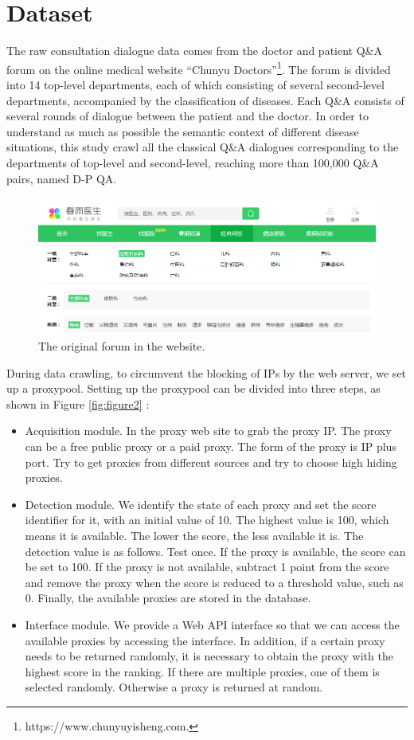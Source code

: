 \section{Dataset}
\label{dataset}

The raw consultation dialogue data comes from the doctor and patient Q\&A 
forum on the online medical website ``Chunyu Doctors''\footnote{https://www.chunyuyisheng.com.}. 
The forum is divided into 14 top-level departments, 
each of which consisting of several second-level departments, 
accompanied by the classification of diseases. 
Each Q\&A consists of several rounds of dialogue between the patient and the doctor. In order to understand as much as possible the semantic context of different disease situations, this study crawl all the classical Q\&A dialogues corresponding to the departments of top-level and second-level, reaching more than 100,000 Q\&A pairs, named D-P QA.

\begin{figure}[h]
\centering
\includegraphics[scale=0.22]{2.png}
\caption{The original forum in the website.}
\label{fig:figure1}
\end{figure}

During data crawling, to circumvent the blocking of IPs by the web server, 
we set up a proxypool. 
Setting up the proxypool can be divided into three steps, as shown in Figure \ref{fig:figure2} : 
\begin{itemize}
\item[(1)]Acquisition module. In the proxy web site to grab the proxy IP. The proxy can be a free public proxy or a paid proxy. The form of the proxy is IP plus port. Try to get proxies from different sources and try to choose high hiding proxies. 
\item[(2)]Detection module. We identify the state of each proxy and set the score identifier for it, with an initial value of 10. The highest value is 100, which means it is available. The lower the score, the less available it is. The detection value is as follows. Test once. If the proxy is available, the score can be set to 100. If the proxy is not available, subtract 1 point from the score and remove the proxy when the score is reduced to a threshold value, such as 0. Finally, the available proxies are stored in the database.
\item[(3)]Interface module. We provide a Web API interface so that we can access the available proxies by accessing the interface. In addition, if a certain proxy needs to be returned randomly, it is necessary to obtain the proxy with the highest score in the ranking. If there are multiple proxies, one of them is selected randomly. Otherwise a proxy is returned at random.
\end{itemize}

